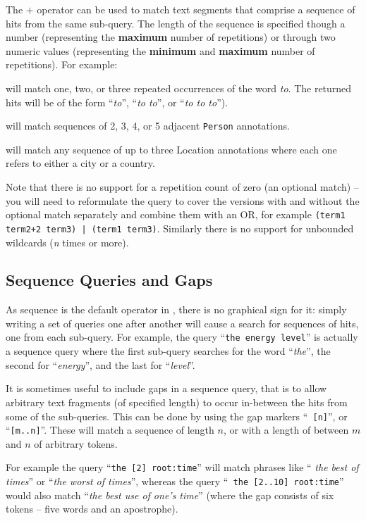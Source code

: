 The $+$ operator can be used to match text segments that comprise a sequence of
hits from the same sub-query. The length of the sequence is specified though a
number (representing the {\bf maximum} number of repetitions) or through two
numeric values (representing the {\bf minimum} and {\bf maximum} number of
repetitions). For example:
\bde
  \item[{\tt to+3}] will match one, two, or three repeated occurrences of the
  word {\it to}. The returned hits will be of the form ``{\it to}'', ``{\it to  
  to}'', or ``{\it to to to}'').
  \item[{\tt \{Person\}+2..5}] will match sequences of 2, 3, 4, or 5
  adjacent {\tt Person} annotations.
  \item[{\tt (\{Location locType = city\} |
  \{Location locType = country\})+3}] will match any sequence of up to
  three Location annotations where each one refers to either a city or a
  country.
\ede

Note that there is no support for a repetition count of zero (an optional
match) -- you will need to reformulate the query to cover the versions with and
without the optional match separately and combine them with an OR, for example
{\tt (term1 term2+2 term3) | (term1 term3)}.  Similarly there is no support for
unbounded wildcards ({\em n} times or more).

\subsection{Sequence Queries and Gaps}\label{sec:sequence-query}

As sequence is the default operator in \Mimir, there is no graphical sign for
it: simply writing a set of queries one after another will cause a search for
sequences of hits, one from each sub-query. For example, the query ``{\tt the
energy level}'' is actually a sequence query where the first sub-query searches
for the word ``{\it the}'', the second for ``{\it energy}'', and the last for
``{\it level}''.

It is sometimes useful to include gaps in a sequence query, that is to allow
arbitrary text fragments (of specified length) to occur in-between the hits
from some of the sub-queries. This can be done by using the gap markers ``{\tt
[n]}'', or ``{\tt [m..n]}''. These will match a sequence of length $n$, or with
a length of between $m$ and $n$ of arbitrary tokens.

For example the query ``{\tt the [2] root:time}'' will match phrases like ``{\it
the best of times}'' or ``{\it the worst of times}'', whereas the query ``{\tt
the [2..10] root:time}'' would also match ``{\it the best use of one's time}''
(where the gap consists of six tokens -- five words and an apostrophe).

